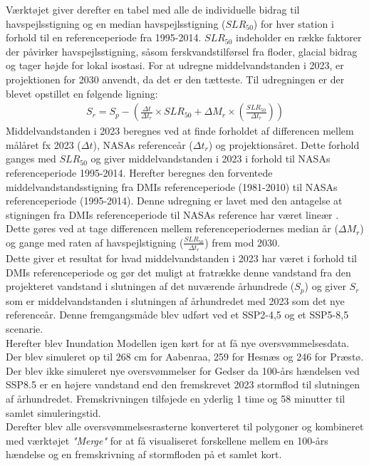 Værktøjet giver derefter en tabel med alle de individuelle bidrag til havspejlsstigning og en median havspejlsstigning ($SLR_{50}$) for hver station i forhold til en referenceperiode fra 1995-2014. $SLR_{50}$ indeholder en række faktorer der påvirker havspejlsstigning, såsom ferskvandstilførsel fra floder, glacial bidrag og tager højde for lokal isostasi. For at udregne middelvandstanden i 2023, er projektionen for 2030 anvendt, da det er den tætteste. Til udregningen er der blevet opstillet en følgende ligning: 
\begin{align} \label{Equation: Vandstandsstigning calculation}
    S_r = S_p- \left( \frac{\Delta{t}}{\Delta{t_r}}\times SLR_{50} + \Delta{M_r} \times \left(\frac{SLR_{50}}{\Delta{t_r}}\right) \right)
\end{align}
Middelvandstanden i 2023 beregnes ved at finde forholdet af differencen mellem målåret fx 2023 ($\Delta{t}$), NASAs referenceår ($\Delta{t_r}$) og projektionsåret. Dette forhold ganges med $SLR_{50}$ og giver middelvandstanden i 2023 i forhold til NASAs referenceperiode 1995-2014. Herefter beregnes den forventede middelvandstandsstigning fra DMIs referenceperiode (1981-2010) til NASAs referenceperiode (1995-2014). Denne udregning er lavet med den antagelse at stigningen fra DMIs referenceperiode til NASAs reference har været lineær \citep{danish_meteorological_institute_dmi_2024}. Dette gøres ved at tage differencen mellem referenceperiodernes median år ($\Delta{M_r}$) og gange med raten af havspejlstigning ($\frac{SLR_{50}}{\Delta{t_r}}$) frem mod 2030. \\
Dette giver et resultat for hvad middelvandstanden i 2023 har været i forhold til DMIs referenceperiode og gør det muligt at fratrække denne vandstand fra den projekteret vandstand i slutningen af det nuværende århundrede ($S_p$) og giver $S_r$ som er middelvandstanden i slutningen af århundredet med 2023 som det nye referenceår. Denne fremgangsmåde blev udført ved et SSP2-4,5 og et SSP5-8,5 scenarie.\\

Herefter blev Inundation Modellen igen kørt for at få nye oversvømmelsesdata. Der blev simuleret op til 268 cm for Aabenraa, 259 for Hesnæs og 246 for Præstø. Der blev ikke simuleret nye oversvømmelser for Gedser da 100-års hændelsen ved SSP8.5 er en højere vandstand end den fremskrevet 2023 stormflod til slutningen af århundredet. Fremskrivningen tilføjede en yderlig 1 time og 58 minutter til samlet simuleringstid.\\


Derefter blev alle oversvømmelsesrasterne konverteret til polygoner og kombineret med værktøjet \textit{"Merge"} for at få visualiseret forskellene mellem en 100-års hændelse og en fremskrivning af stormfloden på et samlet kort.
